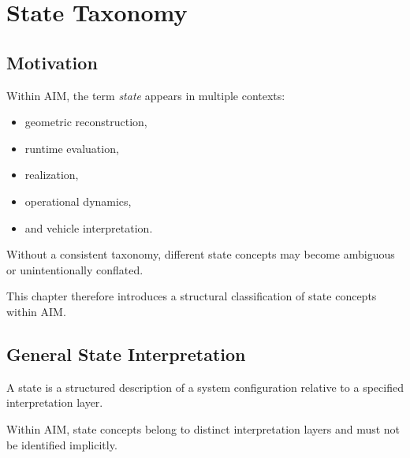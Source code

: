 
\chapter{State Taxonomy}

\label{chap:state-taxonomy}

\section{Motivation}

\begin{remark}
Within AIM, the term \emph{state} appears in multiple contexts:
\begin{itemize}
\item geometric reconstruction,
\item runtime evaluation,
\item realization,
\item operational dynamics,
\item and vehicle interpretation.
\end{itemize}
\end{remark}

\begin{remark}
Without a consistent taxonomy, different state concepts may become
ambiguous or unintentionally conflated.
\end{remark}

\begin{remark}
This chapter therefore introduces a structural classification of state
concepts within AIM.
\end{remark}

\section{General State Interpretation}

\begin{definition}[State]
\label{def:taxonomy-general-state}
A state is a structured description of a system configuration relative
to a specified interpretation layer.
\end{definition}

\begin{principle}
\label{princ:state-layer-principle}
Within AIM, state concepts belong to distinct interpretation layers and
must not be identified implicitly.
\end{principle}

